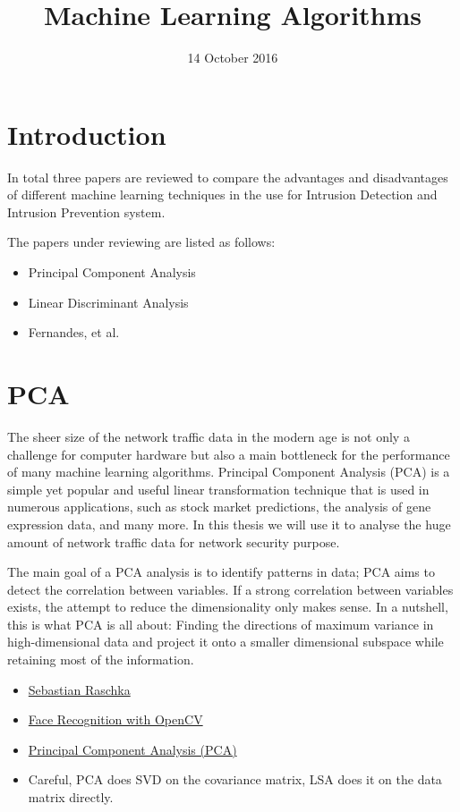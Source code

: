 \documentclass[a4paper]{article}
\title{Machine Learning Algorithms}
\author{}
\date{14 October 2016}
\begin{document}
\maketitle
	

\section{Introduction}
In total three papers are reviewed to compare the advantages and disadvantages of different machine learning techniques in the use for Intrusion Detection and Intrusion Prevention system.

The papers under reviewing are listed as follows:
\begin{itemize}
	\item Principal Component Analysis
	\item Linear Discriminant Analysis 
	\item Fernandes, et al. \cite{fernandes2016network}
\end{itemize}

\section{PCA}
The sheer size of the network traffic data in the modern age is not only a challenge for computer hardware but also a main bottleneck for the performance of many machine learning algorithms. Principal Component Analysis (PCA) is a simple yet popular and useful linear transformation technique that is used in numerous applications, such as stock market predictions, the analysis of gene expression data, and many more. In this thesis we will use it to analyse the huge amount of network traffic data for network security purpose. 

The main goal of a PCA analysis is to identify patterns in data; PCA aims to detect the correlation between variables. If a strong correlation between variables exists, the attempt to reduce the dimensionality only makes sense. In a nutshell, this is what PCA is all about: Finding the directions of maximum variance in high-dimensional data and project it onto a smaller dimensional subspace while retaining most of the information.

\begin{itemize}
	\item \href{http://sebastianraschka.com/Articles/2015_pca_in_3_steps.html}{Sebastian Raschka}
	\item \href{http://docs.opencv.org/2.4/modules/contrib/doc/facerec/facerec_tutorial.html}{Face Recognition with OpenCV}
	\item \href{https://www.reddit.com/r/math/comments/1vu9ev/principal_component_analysis_pca/}{Principal Component Analysis (PCA)}
	\item Careful, PCA does SVD on the covariance matrix, LSA does it on the data matrix directly.
\end{itemize}
\end{document}
